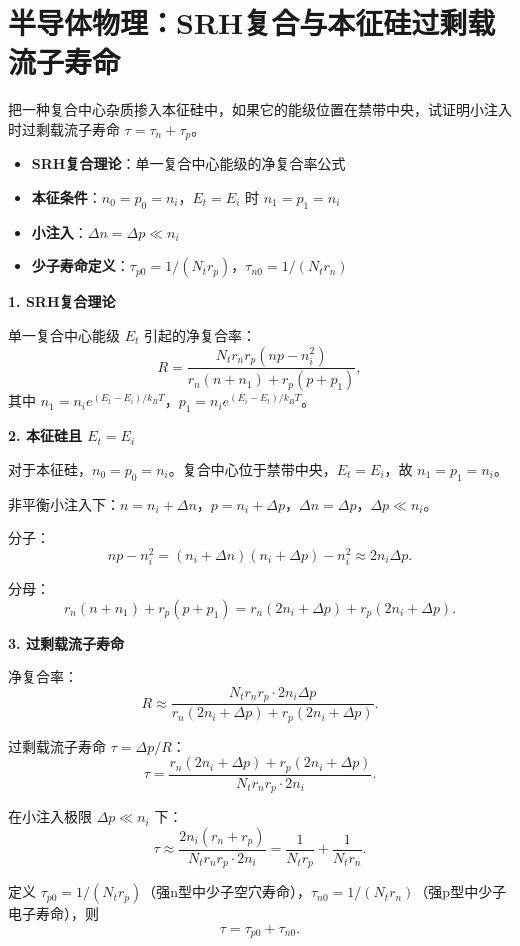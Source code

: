 \section{半导体物理：SRH复合与本征硅过剩载流子寿命}
\label{sec:srh-lifetime}

\begin{modelbox}[题目：本征硅中复合中心位于禁带中央时的过剩载流子寿命]
把一种复合中心杂质掺入本征硅中，如果它的能级位置在禁带中央，试证明小注入时过剩载流子寿命 $\tau=\tau_n+\tau_p$。
\end{modelbox}

\begin{tipbox}[考点快速分析]
\begin{itemize}
    \item \textbf{SRH复合理论}：单一复合中心能级的净复合率公式
    \item \textbf{本征条件}：$n_0=p_0=n_i$，$E_t=E_i$ 时 $n_1=p_1=n_i$
    \item \textbf{小注入}：$\Delta n=\Delta p\ll n_i$
    \item \textbf{少子寿命定义}：$\tau_{p0}=1/(N_tr_p)$，$\tau_{n0}=1/(N_tr_n)$
\end{itemize}
\end{tipbox}

\begin{derivationbox}[标准解题过程]
\textbf{1. SRH复合理论}

单一复合中心能级 $E_t$ 引起的净复合率：
\[
R=\frac{N_tr_nr_p(np-n_i^2)}{r_n(n+n_1)+r_p(p+p_1)},
\]
其中 $n_1=n_ie^{(E_t-E_i)/k_BT}$，$p_1=n_ie^{(E_i-E_t)/k_BT}$。

\textbf{2. 本征硅且 $E_t=E_i$}

对于本征硅，$n_0=p_0=n_i$。复合中心位于禁带中央，$E_t=E_i$，故 $n_1=p_1=n_i$。

非平衡小注入下：$n=n_i+\Delta n$，$p=n_i+\Delta p$，$\Delta n=\Delta p$，$\Delta p\ll n_i$。

分子：
\[
np-n_i^2=(n_i+\Delta n)(n_i+\Delta p)-n_i^2\approx2n_i\Delta p.
\]

分母：
\[
r_n(n+n_1)+r_p(p+p_1)=r_n(2n_i+\Delta p)+r_p(2n_i+\Delta p).
\]

\textbf{3. 过剩载流子寿命}

净复合率：
\[
R\approx\frac{N_tr_nr_p\cdot2n_i\Delta p}{r_n(2n_i+\Delta p)+r_p(2n_i+\Delta p)}.
\]

过剩载流子寿命 $\tau=\Delta p/R$：
\[
\tau=\frac{r_n(2n_i+\Delta p)+r_p(2n_i+\Delta p)}{N_tr_nr_p\cdot2n_i}.
\]

在小注入极限 $\Delta p\ll n_i$ 下：
\[
\tau\approx\frac{2n_i(r_n+r_p)}{N_tr_nr_p\cdot2n_i}=\frac{1}{N_tr_p}+\frac{1}{N_tr_n}.
\]

定义 $\tau_{p0}=1/(N_tr_p)$（强n型中少子空穴寿命），$\tau_{n0}=1/(N_tr_n)$（强p型中少子电子寿命），则
\begin{equation}
\boxed{\tau=\tau_{p0}+\tau_{n0}.}
\end{equation}
\end{derivationbox}

